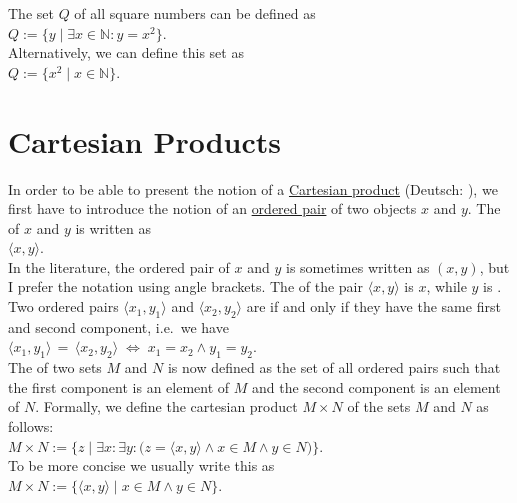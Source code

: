 \exampleEng
The set $Q$ of all square numbers can be defined as 
\\[0.2cm]
\hspace*{1.3cm}
$Q := \{ y \mid \exists x \in \mathbb{N}: y = x^2\}$.
\\[0.2cm]
Alternatively, we can define this set as
\\[0.2cm]
\hspace*{1.3cm}
$Q := \bigl\{ x^2 \mid x \in \mathbb{N} \bigr\}$.
\eox

\section{Cartesian Products}
In order to be able to present the notion of a 
\href{https://en.wikipedia.org/wiki/Cartesian_product}{Cartesian product} (Deutsch: ),
we first have to introduce the notion of an \href{https://en.wikipedia.org/wiki/Ordered_pair}{ordered pair} of two objects
$x$ and $y$.  The  of $x$ and $y$ is written as
\\[0.2cm] 
\hspace*{1.3cm}
$\langle x, y \rangle$.
\\[0.2cm]
In the literature, the ordered pair of $x$ and $y$ is sometimes written as $(x,y)$, but I prefer the notation
using angle brackets.  The   of the pair $\langle x, y \rangle$ is $x$, while $y$ is
.  Two  ordered pairs $\langle x_1, y_1 \rangle$ and $\langle x_2, y_2 \rangle$ are
 if and only if they have the same first and second component, i.e.~we have
\\[0.2cm]
\hspace*{1.3cm}
$\langle x_1, y_1 \rangle \,=\,\langle x_2, y_2 \rangle  \;\Leftrightarrow\; x_1 = x_2 \wedge y_1 = y_2$. 
\\[0.2cm]
The  of two sets $M$ and $N$ is now defined as the set of all ordered pairs such
that the first component is an element of  $M$ and the second component is an element of $N$.
Formally, we define the cartesian product $M \times N$ of the sets $M$ and $N$ as follows:  
\\[0.2cm]
\hspace*{1.3cm}
$M \times N := \big\{ z \mid \exists x\colon \exists y\colon\bigl(z = \langle x,y\rangle \wedge x\in M \wedge y \in N\bigr) \bigr\}$. 
\\[0.2cm]
To be more concise we usually write this as
\\[0.2cm]
\hspace*{1.3cm}
$M \times N := \big\{ \langle x,y\rangle \mid  x\in M \wedge y \in N \}$.

